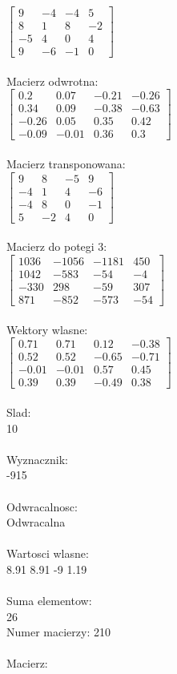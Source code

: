 \documentclass[a4paper,12pt]{article}
\begin{document}
$\begin{bmatrix} 9&-4&-4&5\\8&1&8&-2\\-5&4&0&4\\9&-6&-1&0 \end{bmatrix}$
\\
\\
Macierz odwrotna:\\

$\begin{bmatrix} 0.2&0.07&-0.21&-0.26\\0.34&0.09&-0.38&-0.63\\-0.26&0.05&0.35&0.42\\-0.09&-0.01&0.36&0.3 \end{bmatrix}$
\\
\\
Macierz transponowana:\\

$\begin{bmatrix} 9&8&-5&9\\-4&1&4&-6\\-4&8&0&-1\\5&-2&4&0 \end{bmatrix}$
\\
\\
Macierz do potegi 3:\\

$\begin{bmatrix} 1036&-1056&-1181&450\\1042&-583&-54&-4\\-330&298&-59&307\\871&-852&-573&-54 \end{bmatrix}$
\\
\\
Wektory wlasne:\\

$\begin{bmatrix} 0.71&0.71&0.12&-0.38\\0.52&0.52&-0.65&-0.71\\-0.01&-0.01&0.57&0.45\\0.39&0.39&-0.49&0.38 \end{bmatrix}$
\\
\\
Slad:\\
10
\\
\\
Wyznacznik:\\
-915
\\
\\
Odwracalnosc:\\
Odwracalna
\\
\\
Wartosci wlasne:\\
8.91 8.91 -9 1.19
\\
\\
Suma elementow:\\
26
\\
\newpage
Numer macierzy:
210
\\
\\
Macierz:\\
\end{document}
